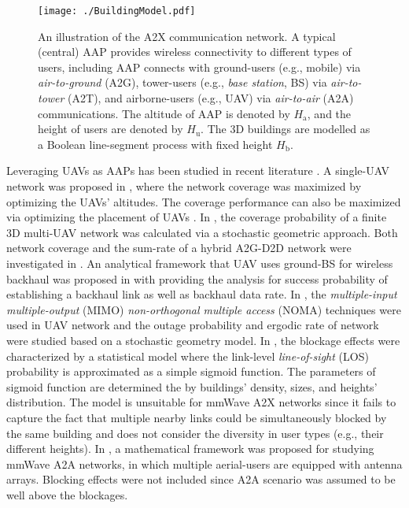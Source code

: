 \documentclass[12pt, draftclsnofoot, onecolumn]{IEEEtran}
\begin{document}

\begin{figure}[t]
\centering
\texttt{[image: ./BuildingModel.pdf]}
\caption{An illustration of the A2X communication network. A typical (central) AAP provides wireless connectivity to different types of users, including AAP connects with ground-users (e.g., mobile) via \emph{air-to-ground} (A2G), tower-users (e.g., \emph{base station}, BS) via \emph{air-to-tower} (A2T), and airborne-users (e.g., UAV) via \emph{air-to-air} (A2A) communications. The altitude of AAP is denoted by $H_\textrm{a}$, and the height of users are denoted by $H_\textrm{u}$. The 3D buildings are modelled as a  Boolean line-segment process with fixed height $H_\textrm{b}$. }\label{SystemModel}
\end{figure}

Leveraging UAVs as AAPs  has been studied in recent literature \cite{al2014optimal, lyu2017placement, chetlur2017downlink, mozaffari2016unmanned, galkin2017stochastic, hou2018multiple, cuvelier2018mmwave}. A single-UAV network was proposed in \cite{al2014optimal}, where the network coverage was maximized by optimizing the UAVs' altitudes. The coverage performance can also be maximized via optimizing the placement of UAVs \cite{lyu2017placement}. In \cite{chetlur2017downlink}, the coverage probability of a finite 3D multi-UAV network was calculated via a stochastic geometric  approach. Both network coverage and the sum-rate of a hybrid A2G-D2D network were investigated in \cite{mozaffari2016unmanned}. An analytical framework that UAV uses ground-BS for wireless backhaul was proposed in \cite{galkin2017stochastic} with providing the analysis for success probability of establishing a backhaul link as well as backhaul data rate. In \cite{hou2018multiple}, the \emph{multiple-input multiple-output} (MIMO) \emph{non-orthogonal multiple access} (NOMA) techniques were used in UAV network and the outage probability and ergodic rate of network were studied based on a stochastic geometry model. In \cite{al2014optimal, mozaffari2016unmanned, galkin2017stochastic}, the blockage effects were characterized by a statistical model where the link-level \emph{line-of-sight} (LOS) probability is approximated as a simple sigmoid function. The parameters of sigmoid function are determined the by buildings' density, sizes, and heights' distribution. The model is unsuitable for mmWave A2X networks since it fails to capture the fact that multiple nearby links could be simultaneously blocked by the same building and does not consider the diversity in user types  (e.g., their  different heights). In  \cite{cuvelier2018mmwave},  a mathematical framework was proposed  for studying mmWave A2A networks, in which multiple aerial-users are equipped with antenna arrays. Blocking effects were not included since A2A scenario was assumed to be well above the blockages.
\end{document}

